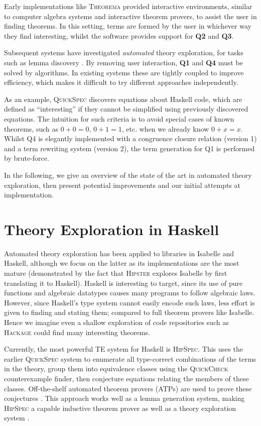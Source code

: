 \documentclass{llncs}
\begin{document}
Early implementations like \textsc{Theorema} \cite{buchberger2000theory}
provided interactive environments, similar to computer algebra systems and
interactive theorem provers, to assist the user in finding theorems. In this
setting, terms are formed by the user in whichever way they find interesting,
whilst the software provides support for \textbf{Q2} and \textbf{Q3}.

Subsequent systems have investigated \emph{automated} theory exploration, for
tasks such as lemma discovery \cite{Hipster}. By removing user interaction,
\textbf{Q1} and \textbf{Q4} must be solved by algorithms. In existing
systems these are tightly coupled to improve efficiency, which makes it
difficult to try different approaches independently.

As an example, \textsc{QuickSpec} \cite{QuickSpec} discovers equations about
Haskell code, which are defined as ``interesting'' if they cannot be simplified
using previously discovered equations. The intuition for such criteria is to
avoid special cases of known theorems, such as $0 + 0 = 0$, $0 + 1 = 1$, etc.
when we already know $0 + x = x$. Whilst \textsc{Q4} is elegantly implemented
with a congruence closure relation (version 1) and a term rewriting system
(version 2), the term generation for \textsc{Q1} is performed by brute-force.

In the following, we give an overview of the state of the art in automated
theory exploration, then present potential improvements and our initial attempts
at implementation.

\section{Theory Exploration in Haskell}\label{haskell}

Automated theory exploration has been applied to libraries in Isabelle
and Haskell, although we focus on the latter as its implementations are
the most mature (demonstrated by the fact that \textsc{Hipster} explores
Isabelle by first translating it to Haskell). Haskell is interesting to target,
since its use of pure functions and algebraic datatypes causes many programs to
follow algebraic laws. However, since Haskell's type system cannot easily
encode such laws, less effort is given to finding and stating them; compared to
full theorem provers like Isabelle. Hence we imagine even a shallow exploration
of code repositories such as \textsc{Hackage} could find many interesting
theorems.

Currently, the most powerful TE system for Haskell is \textsc{HipSpec}. This
uses the earlier \textsc{QuickSpec} system to enumerate all type-correct
combinations of the terms in the theory, group them into equivalence
classes using the \textsc{QuickCheck} counterexample finder, then conjecture
equations relating the members of these classes. Off-the-shelf automated theorem
provers (ATPs) are used to prove these conjectures \cite{rosen2012proving}. This
approach works well as a lemma generation system, making \textsc{HipSpec} a
capable inductive theorem prover as well as a theory exploration system
\cite{claessen2013automating}.
\end{document}
